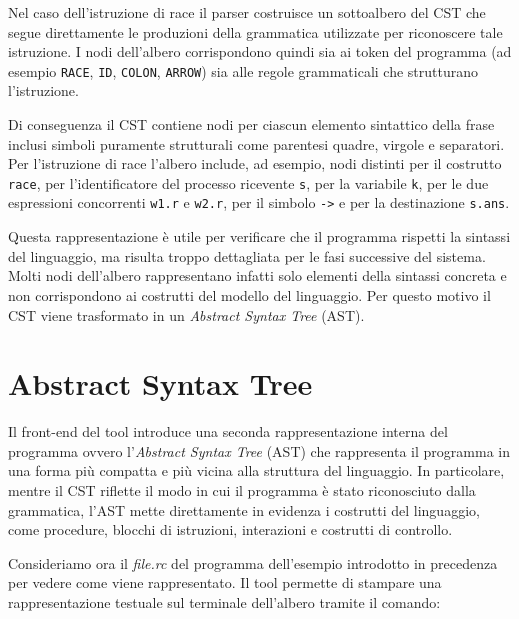 Nel caso dell’istruzione di race il parser costruisce un sottoalbero del CST che segue direttamente le produzioni della grammatica utilizzate per riconoscere tale istruzione. I nodi dell’albero corrispondono quindi sia ai token del programma (ad esempio \texttt{RACE}, \texttt{ID}, \texttt{COLON}, \texttt{ARROW}) sia alle regole grammaticali che strutturano l’istruzione.

Di conseguenza il CST contiene nodi per ciascun elemento sintattico della frase inclusi simboli puramente strutturali come parentesi quadre, virgole e separatori. Per l’istruzione di race l’albero include, ad esempio, nodi distinti per il costrutto \texttt{race}, per l’identificatore del processo ricevente \texttt{s}, per la variabile \texttt{k}, per le due espressioni concorrenti \texttt{w1.r} e \texttt{w2.r}, per il simbolo \texttt{->} e per la destinazione \texttt{s.ans}.

Questa rappresentazione è utile per verificare che il programma rispetti la sintassi del linguaggio, ma risulta troppo dettagliata per le fasi successive del sistema. Molti nodi dell’albero rappresentano infatti solo elementi della sintassi concreta e non corrispondono ai costrutti del modello del linguaggio. Per questo motivo il CST viene trasformato in un \textit{Abstract Syntax Tree} (AST).
\section{Abstract Syntax Tree}

Il front-end del tool introduce una seconda rappresentazione interna del programma ovvero l’\textit{Abstract Syntax Tree} (AST) che rappresenta il programma in una forma più compatta e più vicina alla struttura del linguaggio. In particolare, mentre il CST riflette il modo in cui il programma è stato riconosciuto dalla grammatica, l’AST mette direttamente in evidenza i costrutti del linguaggio, come procedure, blocchi di istruzioni, interazioni e costrutti di controllo.

Consideriamo ora il \textit{file.rc} del programma dell'esempio introdotto in precedenza per vedere come viene rappresentato. Il tool permette di stampare una rappresentazione testuale sul terminale dell’albero tramite il comando:

